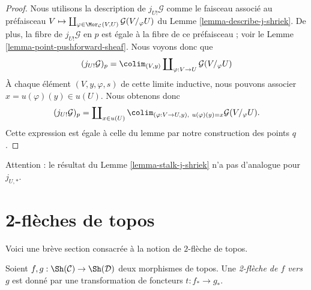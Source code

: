 \begin{proof}
Nous utilisons la description de $j_{U!}\mathcal{G}$ comme le faisceau associé
au préfaisceau
$V \mapsto
\coprod\nolimits_{\varphi \in \Mor_\mathcal{C}(V, U)}
\mathcal{G}(V/_\varphi U)$
du
Lemme \ref{lemma-describe-j-shriek}.
De plus, la fibre de $j_{U!}\mathcal{G}$ en $p$ est égale à la
fibre de ce préfaisceau ; voir le
Lemme \ref{lemma-point-pushforward-sheaf}.
Nous voyons donc que
$$
(j_{U!}\mathcal{G})_p =
\colim_{(V, y)} \coprod\nolimits_{\varphi : V \to U} \mathcal{G}(V/_\varphi U)
$$
À chaque élément $(V, y, \varphi, s)$ de cette limite inductive, nous pouvons associer
$x = u(\varphi)(y) \in u(U)$. Nous obtenons donc
$$
(j_{U!}\mathcal{G})_p =
\coprod\nolimits_{x \in u(U)}
\colim_{(\varphi : V \to U, y), \ u(\varphi)(y) = x} \mathcal{G}(V/_\varphi U).
$$
Cette expression est égale à celle du lemme par notre
construction des points $q$.
\end{proof}

\begin{remark}
\label{remark-not-pushforward}
Attention : le résultat du
Lemme \ref{lemma-stalk-j-shriek}
n’a pas d’analogue pour $j_{U, *}$.
\end{remark}




\section{2-flèches de topos}
\label{section-2-category}

\noindent
Voici une brève section consacrée à la notion de $2$-flèche
de topos.

\begin{definition}
\label{definition-2-morphism-topoi}
Soient $f, g : \Sh(\mathcal{C}) \to \Sh(\mathcal{D})$
deux morphismes de topos. Une {\it 2-flèche de $f$ vers $g$}
est donné par une transformation de foncteurs $t : f_* \to g_*$.
\end{definition}

